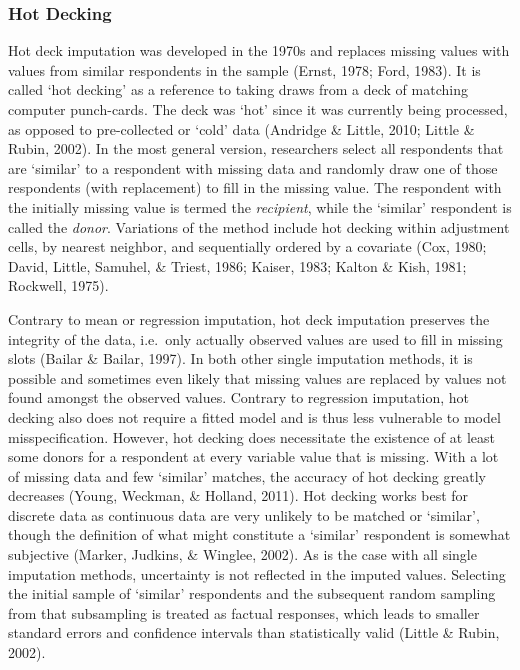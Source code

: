 \documentclass[12pt,econ]{sources/authesis}
\begin{document}
\hypertarget{ordmiss-theory-impute-hd}{%
\subsubsection{Hot Decking}\label{ordmiss-theory-impute-hd}}

Hot deck imputation was developed in the 1970s and replaces missing values with values from similar respondents in the sample (Ernst, 1978; Ford, 1983). It is called `hot decking' as a reference to taking draws from a deck of matching computer punch-cards. The deck was `hot' since it was currently being processed, as opposed to pre-collected or `cold' data (Andridge \& Little, 2010; Little \& Rubin, 2002). In the most general version, researchers select all respondents that are `similar' to a respondent with missing data and randomly draw one of those respondents (with replacement) to fill in the missing value. The respondent with the initially missing value is termed the \textit{recipient}, while the `similar' respondent is called the \textit{donor}. Variations of the method include hot decking within adjustment cells, by nearest neighbor, and sequentially ordered by a covariate (Cox, 1980; David, Little, Samuhel, \& Triest, 1986; Kaiser, 1983; Kalton \& Kish, 1981; Rockwell, 1975).

Contrary to mean or regression imputation, hot deck imputation preserves the integrity of the data, i.e.~only actually observed values are used to fill in missing slots (Bailar \& Bailar, 1997). In both other single imputation methods, it is possible and sometimes even likely that missing values are replaced by values not found amongst the observed values. Contrary to regression imputation, hot decking also does not require a fitted model and is thus less vulnerable to model misspecification. However, hot decking does necessitate the existence of at least some donors for a respondent at every variable value that is missing. With a lot of missing data and few `similar' matches, the accuracy of hot decking greatly decreases (Young, Weckman, \& Holland, 2011). Hot decking works best for discrete data as continuous data are very unlikely to be matched or `similar', though the definition of what might constitute a `similar' respondent is somewhat subjective (Marker, Judkins, \& Winglee, 2002). As is the case with all single imputation methods, uncertainty is not reflected in the imputed values. Selecting the initial sample of `similar' respondents and the subsequent random sampling from that subsampling is treated as factual responses, which leads to smaller standard errors and confidence intervals than statistically valid (Little \& Rubin, 2002).
\end{document}
